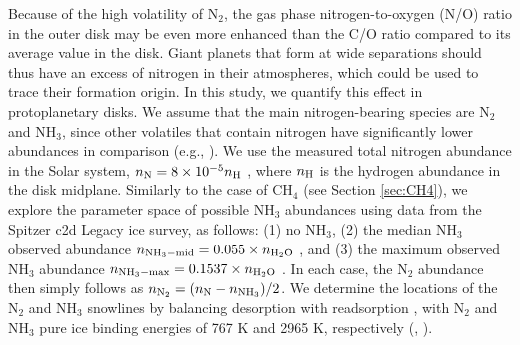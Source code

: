 \documentclass[apj]{emulateapj}
\begin{document}
Because of the high volatility of N$_2$, the gas phase nitrogen-to-oxygen (N/O) ratio in the outer disk
may be even more enhanced than the C/O ratio compared to its average value in the disk. Giant planets that form at wide separations should thus have an excess of nitrogen in their atmospheres, which could be used to trace their formation origin.  In this study, we quantify this effect in protoplanetary disks. We assume that the main nitrogen-bearing species are N$_2$ and NH$_3$, since other volatiles that contain nitrogen have significantly lower abundances in comparison (e.g., \citealt{mumma11}). We use the measured total nitrogen abundance in the Solar system, $n_{\rm N}=8 \times 10^{-5} n_{\rm H}$ \citep{lodders03}, where $n_{\rm H}$ is the hydrogen abundance in the disk midplane. Similarly to the case of CH$_4$ (see Section \ref{sec:CH4}), we explore the parameter space of possible NH$_3$ abundances using data from the Spitzer c2d Legacy ice survey, as follows: (1) no NH$_3$, (2) the median NH$_3$ observed abundance $n_{\rm NH_3-mid}=0.055 \times n_{\rm H_2O}$ \citep{oberg11a}, and (3) the maximum observed NH$_3$ abundance $n_{\rm NH_3-max}=0.1537 \times n_{\rm H_2O}$ \citep{bottinelli10}. In each case, the N$_2$ abundance then simply follows as $n_{\rm N_2}=(n_{\rm N}-n_{\rm NH_3})/2$. We determine the locations of the N$_2$ and NH$_3$ snowlines by balancing desorption with readsorption \citep{hollenbach09}, with N$_2$ and NH$_3$ pure ice binding energies of  767 K and  2965 K, respectively (\citealt{fayolle16}, \citealt{martin14}). 
\end{document}
